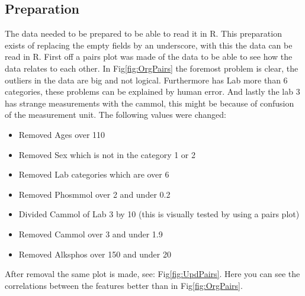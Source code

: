 \documentclass{article}
\begin{document}
    \subsection{Preparation}
      The data needed to be prepared to be able to read it in R.
      This preparation exists of replacing the empty fields by an underscore, with this the data can be read in R.
      First off a pairs plot was made of the data to be able to see how the data relates to each other.
      In Fig\ref{fig:OrgPairs} the foremost problem is clear, the outliers in the data are big and not logical.
      Furthermore has Lab more than 6 categories, these problems can be explained by human error.
      And lastly the lab 3 has strange measurements with the cammol, this might be because of confusion of the measurement unit.
      The following values were changed:
      \begin{itemize}
        \item Removed Ages over 110
        \item Removed Sex which is not in the category 1 or 2
        \item Removed Lab categories which are over 6
        \item Removed Phosmmol over 2 and under 0.2
        \item Divided Cammol of Lab 3 by 10 (this is visually tested by using a pairs plot)
        \item Removed Cammol over 3 and under 1.9
        \item Removed Alksphos over 150 and under 20
      \end{itemize}
      After removal the same plot is made, see: Fig\ref{fig:UpdPairs}.
      Here you can see the correlations between the features better than in Fig\ref{fig:OrgPairs}.
\end{document}
